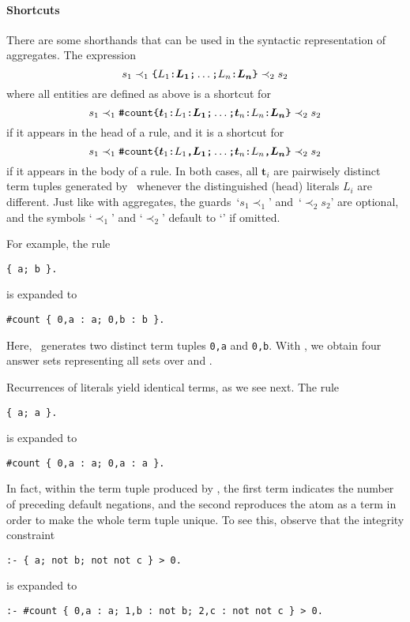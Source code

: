 \paragraph{Shortcuts}
There are some shorthands that can be used in the syntactic representation of aggregates.
%
The expression
%
\[s_1 \prec_1 \texttt{\{}L_1\texttt{:}\boldsymbol{L_1}\texttt{;}\dots\texttt{;}L_n\texttt{:}\boldsymbol{L_n}\texttt{\}} \prec_2 s_2\]
%
where all entities are defined as above
is a shortcut for
%
\[s_1 \prec_1 \texttt{\#count\{}\boldsymbol{t}_1\texttt{:}L_1\texttt{:}\boldsymbol{L_1}\texttt{;}\dots\texttt{;}\boldsymbol{t}_n\texttt{:}L_n\texttt{:}\boldsymbol{L_n} \texttt{\}}\prec_2 s_2\]
%
if it appears in the head of a rule, and
it is a shortcut for
%
\[s_1 \prec_1 \texttt{\#count} \texttt{\{}\boldsymbol{t}_1\texttt{:}L_1\texttt{,}\boldsymbol{L_1}\texttt{;}\dots\texttt{;}\boldsymbol{t}_n\texttt{:}L_n\texttt{,}\boldsymbol{L_n}\texttt{\}}\prec_2 s_2\]
%
if it appears in the body of a rule.
In both cases, all $\boldsymbol{t}_i$ are pairwisely distinct term tuples generated by \gringo\
whenever the distinguished (head) literals $L_i$ are different.
%
Just like with aggregates, the guards~`$s_1\prec_1$' and~`$\prec_2 s_2$' are optional, and the symbols `$\prec_1$' and `$\prec_2$' default to `\code{<=}' if omitted.

For example, the rule
\begin{lstlisting}[numbers=none]
{ a; b }.
\end{lstlisting}
is expanded to
\begin{lstlisting}[numbers=none]
#count { 0,a : a; 0,b : b }.
\end{lstlisting}
Here, \gringo\ generates two distinct term tuples \lstinline{0,a} and \lstinline{0,b}.
With \clingo, we obtain four answer sets representing all sets over \code{a} and .

Recurrences of literals yield identical terms, as we see next.
The rule
\begin{lstlisting}[numbers=none]
{ a; a }.
\end{lstlisting}
is expanded to
\begin{lstlisting}[numbers=none]
#count { 0,a : a; 0,a : a }.
\end{lstlisting}

In fact, within the term tuple produced by \gringo,
the first term indicates the number of preceding default negations,
and the second reproduces the atom as a term in order to make the whole term tuple unique.
%
To see this, observe that the integrity constraint
\begin{lstlisting}[numbers=none]
:- { a; not b; not not c } > 0.
\end{lstlisting}
is expanded to
\begin{lstlisting}[numbers=none]
:- #count { 0,a : a; 1,b : not b; 2,c : not not c } > 0.
\end{lstlisting}

